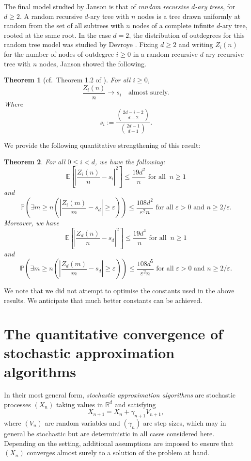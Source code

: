 \documentclass[12pt]{amsart}
\newtheorem{theorem}{Theorem}[section]
\theoremstyle{definition}
\theoremstyle{remark}
\newcommand{\PP}{\mathbb{P}}
\newcommand{\EE}{\mathbb{E}}
\newcommand{\eps}{\varepsilon}
\begin{document}
The final model studied by Janson \cite{janson2005asymptotic} is that of \emph{random recursive $d$-ary trees}, for $d \geq 2$. A random recursive $d$-ary tree with 
$n$ nodes is a tree drawn uniformly at random from the set of all subtrees with 
$n$ nodes of a complete infinite $d$-ary tree, rooted at the same root. In the case $d=2 $, the distribution of outdegrees for this random tree model was studied by Devroye \cite{devroye1991limit}. Fixing $d\ge 2$ and writing $Z_i(n)$ for the number of nodes of outdegree $i \geq 0$ in a random recursive $d$-ary recursive tree with $n$ nodes, Janson showed the following. 

\begin{theorem}[{cf.\ Theorem 1.2 of \cite{janson2005asymptotic}}]
\label{thrm:jan:dary}
    For all $i \geq 0$,
    \[
    \frac{Z_i(n)}{n} \to s_i \quad \text{almost surely.}
    \]
    Where 
    \[
    s_i:=\frac{\binom{2d-i-2}{d-2}}{\binom{2d-1}{d-1}}.
    \]
\end{theorem}
We provide the following quantitative strengthening of this result:
\begin{theorem}
\label{thrm:main:dary}
   For all $0\le i< d$, we have the following:
    \[
    \EE\left[ \left| \frac{Z_i(n)}{n} - s_i\right|^2 \right]\leq \frac{19d^2}{n} \text{ for all }\ n\geq 1
    \]
    and
    \[
    \PP\left( \exists m\geq  n \left( \left|\frac{Z_i(m)}{m} - s_d\right|\geq \eps \right) \right)\leq \frac{108d^2}{\eps^2n} \text{ for all } \eps>0 \text{ and } n\geq 2/\eps.
    \]
    Moreover, we have
        \[
    \EE\left[ \left| \frac{Z_d(n)}{n} - s_d\right|^2 \right]\leq \frac{19d^4}{n} \text{ for all }\ n\geq 1
    \]
    and
    \[
    \PP\left( \exists m\geq  n \left( \left|\frac{Z_d(m)}{m} - s_d\right|\geq \eps \right) \right)\leq \frac{108d^5}{\eps^2n} \text{ for all } \eps>0 \text{ and } n\geq 2/\eps.
    \]
\end{theorem}
We note that we did not attempt to optimise the constants used in the above results. We anticipate that much better constants can be achieved.


\section{The quantitative convergence of stochastic approximation algorithms}
\label{subsec:SA:quant}

In their most general form, \emph{stochastic approximation algorithms} are stochastic processes $(X_n)$ taking values in $\mathbb{R}^d$ and satisfying
\begin{equation*}
    X_{n+1} = X_n + \gamma_{n+1} V_{n+1},
\end{equation*}
where $(V_n)$ are random variables and $(\gamma_n)$ are step sizes, which may in general be stochastic but are deterministic in all cases considered here. Depending on the setting, additional assumptions are imposed to ensure that $(X_n)$ converges almost surely to a solution of the problem at hand.
\end{document}
